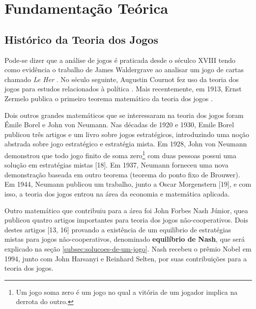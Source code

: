 \chapter[Fundamentação Teórica]{Fundamentação Teórica}
\label{cha:fundamentacao-teorica}

\section{Histórico da Teoria dos Jogos}
\label{sec:historico-da-teoria-dos-jogos}

Pode-se dizer que a análise de jogos é praticada desde o séculco XVIII
tendo como evidência o trabalho de James Waldergrave ao analisar um jogo
de cartas chamado \emph{Le Her} \cite{Prague_severalmilestones}. No
século seguinte, Augustin Cournot fez uso da teoria dos jogos para
estudos relacionados à política \cite{cournot_1838}. Mais recentemente,
em 1913, Ernst Zermelo publica o primeiro teorema matemático da teoria
dos jogos \cite{zermelo_1913}.

Dois outros grandes matemáticos que se interessaram na teoria dos jogos
foram Émile Borel e John von Neumann. Nas décadas de 1920 e 1930, Emile
Borel publicou três artigos \cite{borel_1921} \cite{borel_1924}
\cite{borel_1927} e um livro \cite{borel_1938} sobre jogos estratégicos,
introduzindo uma noção abstrada sobre jogo estratégico e estratégia
mista. Em 1928, John von Neumann demonstrou que todo jogo finito de soma
zero\footnote{Um jogo soma zero é um
 jogo no qual a vitória de um jogador implica na derrota do outro.} com
duas pessoas possui uma solução em estratégias mistas {[}18{]}. Em 1937,
Neumann forneceu uma nova demonstração baseada em outro teorema (teorema
do ponto fixo de Brouwer). Em 1944, Neumann publicou um trabalho, junto
a Oscar Morgenstern {[}19{]}, e com isso, a teoria dos jogos entrou na
área da economia e matemática aplicada.

Outro matemático que contribuiu para a área foi John Forbes Nash Júnior,
quea publicou quatro artigos importantes para teoria dos jogos
não-cooperativos. Dois destes artigos {[}13, 16{]} provando a existência
de um equilíbrio de estratégias mistas para jogos não-cooperativos,
denominado \textbf{equilíbrio de Nash}, que será explicado na seção
\ref{subsec:solucoes-de-um-jogo}. Nash recebeu o prêmio Nobel em 1994,
junto com John Harsanyi e Reinhard Selten, por suas contribuições para a
teoria dos jogos.
